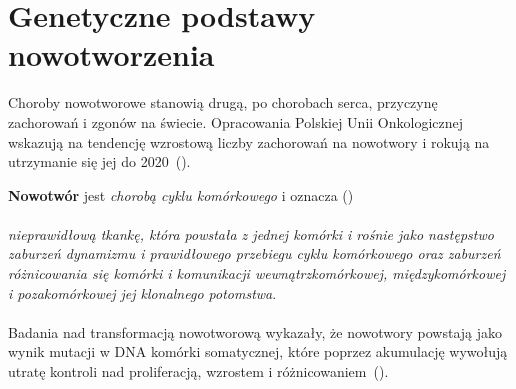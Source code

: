 \section{Genetyczne podstawy nowotworzenia}\label{cha:gen}
Choroby nowotworowe stanowią drugą, po chorobach serca, przyczynę zachorowań i zgonów na świecie. Opracowania Polskiej Unii Onkologicznej wskazują na tendencję wzrostową liczby zachorowań na nowotwory i rokują na utrzymanie się jej do 2020~(\cite{zikula}).

\textbf{Nowotwór} jest \textit{chorobą cyklu komórkowego} i oznacza (\cite{zikula2}) \\ \ \\ \textit{nieprawidłową tkankę, która powstała z jednej komórki i rośnie jako następstwo zaburzeń dynamizmu i prawidłowego przebiegu cyklu komórkowego oraz zaburzeń różnicowania się komórki i komunikacji wewnątrzkomórkowej, międzykomórkowej i pozakomórkowej jej klonalnego potomstwa}. \\ \ \\
Badania nad transformacją nowotworową wykazały, że nowotwory powstają jako wynik mutacji w DNA komórki somatycznej, które poprzez akumulację wywołują utratę kontroli nad proliferacją, wzrostem i różnicowaniem~(\cite{zikula5}).


